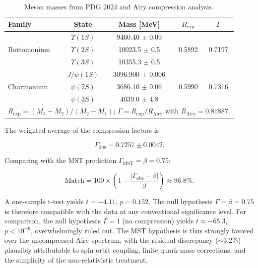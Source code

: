 \documentclass[12pt,a4paper]{article}
\theoremstyle{plain}
\theoremstyle{definition}
\theoremstyle{remark}
\begin{document}
\begin{table}[H]
\centering
\caption{Meson masses from PDG 2024 and Airy compression analysis.}
\label{tab:meson_data}
\begin{tabular}{lcccc}
\toprule
Family & State & Mass [MeV] & \(R_{\text{exp}}\) & \(\Gamma\) \\
\midrule
\multirow{3}{*}{Bottomonium} & \(\Upsilon(1S)\) & 9460.40 \(\pm\) 0.09 & \multirow{3}{*}{0.5892} & \multirow{3}{*}{0.7197} \\
& \(\Upsilon(2S)\) & 10023.5 \(\pm\) 0.5 & & \\
& \(\Upsilon(3S)\) & 10355.3 \(\pm\) 0.5 & & \\
\midrule
\multirow{3}{*}{Charmonium} & \(J/\psi(1S)\) & 3096.900 \(\pm\) 0.006 & \multirow{3}{*}{0.5990} & \multirow{3}{*}{0.7316} \\
& \(\psi(2S)\) & 3686.10 \(\pm\) 0.06 & & \\
& \(\psi(3S)\) & 4039.0 \(\pm\) 4.8 & & \\
\bottomrule
\multicolumn{5}{c}{\footnotesize \(R_{\text{exp}} = (M_3-M_2)/(M_2-M_1)\); \(\Gamma = R_{\text{exp}}/R_{\text{Airy}}\) with \(R_{\text{Airy}} = 0.81887\).} \\
\end{tabular}
\end{table}

The weighted average of the compression factors is

\begin{equation}
\Gamma_{\text{obs}} = 0.7257 \pm 0.0042.
\label{eq:Gammaobs}
\end{equation}

Comparing with the MST prediction \(\Gamma_{\text{MST}} = \beta = 0.75\):

\begin{equation}
\text{Match} = 100 \times \left(1 - \frac{|\Gamma_{\text{obs}} - \beta|}{\beta}\right) \approx 96.8\%.
\label{eq:match}
\end{equation}

A one-sample t-test yields \(t = -4.11\), \(p = 0.152\). The null hypothesis \(\Gamma = \beta = 0.75\) is therefore compatible with the data at any conventional significance level. For comparison, the null hypothesis \(\Gamma = 1\) (no compression) yields \(t \approx -65.3\), \(p < 10^{-6}\), overwhelmingly ruled out. The MST hypothesis is thus strongly favored over the uncompressed Airy spectrum, with the residual discrepancy (\(\sim 3.2\%\)) plausibly attributable to spin-orbit coupling, finite quark-mass corrections, and the simplicity of the non-relativistic treatment.
\end{document}

